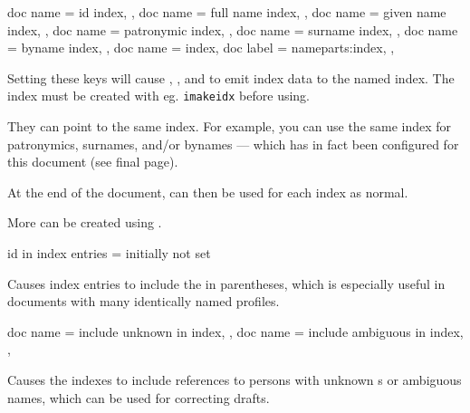 \documentclass[
	a4paper,
]{article}
\begin{document}
\clearpage
\begin{docKeys}
	[
		doc parameter = {=\meta{...}},
		doc description = {initially not set},
	]
	{
		{
			doc name = id index,
		},
		{
			doc name = full name index,
		},
		{
			doc name = given name index,
		},
		{
			doc name = patronymic index,
		},
		{
			doc name = surname index,
		},
		{
			doc name = byname index,
		},
		{
			doc name =  index,
			doc label = nameparts:index,
		},
	}

	Setting these keys will cause , , and  to emit index data to the named index. The index must be created with eg. \texttt{imakeidx} before using.

	They can point to the same index. For example, you can use the same index for patronymics, surnames, and/or bynames --- which has in fact been configured for this document (see final page).

	At the end of the document,  can then be used for each index as normal.

	More can be created using .
\end{docKeys}

\begin{docKey}
	{id in index entries}
	{=}
	{initially not set}

	Causes index entries to include the  in parentheses, which is especially useful in documents with many identically named profiles.
\end{docKey}

\begin{docKeys}
	[
		doc parameter = {=\meta{true/false}},
		doc description = {initially not set},
	]
	{
		{
			doc name = include unknown in index,
		},
		{
			doc name = include ambiguous in index,
		},
	}

	Causes the indexes to include references to persons with unknown s or ambiguous names, which can be used for correcting drafts.

\end{docKeys}
\end{document}
